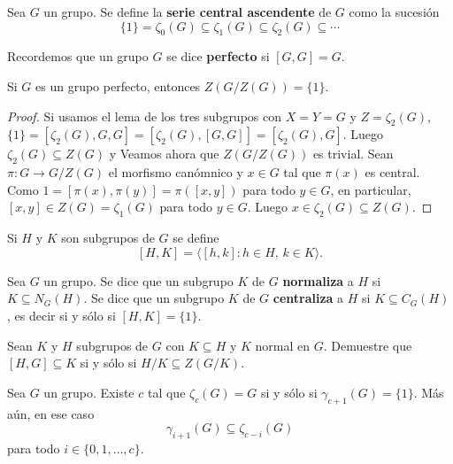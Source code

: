 \begin{definition}
	Sea $G$ un grupo. Se define la \textbf{serie central ascendente} de $G$
	como la sucesión
	\[
		\{1\}=\zeta_0(G)\subseteq\zeta_1(G)\subseteq\zeta_2(G)\subseteq\cdots
	\]
\end{definition}


Recordemos que un grupo $G$ se dice \textbf{perfecto} si $[G,G]=G$.

\begin{theorem}[Gr\"un]
	\label{theorem:Grun}
	Si $G$ es un grupo perfecto, entonces $Z(G/Z(G))=\{1\}$. 
\end{theorem}

\begin{proof}
	Si usamos el lema de los tres subgrupos con $X=Y=G$ y $Z=\zeta_2(G)$, 
	$\{1\}=[\zeta_2(G),G,G]=[\zeta_2(G),[G,G]]=[\zeta_2(G),G]$. Luego 	
	$\zeta_2(G)\subseteq Z(G)$ y
	Veamos ahora que  $Z(G/Z(G))$ es trivial. Sean $\pi\colon G\to G/Z(G)$ el morfismo canómnico
	y $x\in G$ tal que 
	$\pi(x)$ es central. Como $1=[\pi(x),\pi(y)]=\pi([x,y])$ para todo $y\in G$, en particular, 
	$[x,y]\in Z(G)=\zeta_1(G)$ para todo $y\in G$. Luego $x\in\zeta_2(G)\subseteq Z(G)$. 
\end{proof}




Si $H$ y $K$ son subgrupos de $G$ se define
\[
	[H,K]=\langle [h,k]:h\in H,\,k\in K\rangle.
\]

    Sea $G$ un grupo. Se dice que un subgrupo $K$ de $G$ \textbf{normaliza} a
	$H$ si $K\subseteq N_G(H)$.
	Se dice que un subgrupo $K$ de $G$ \textbf{centraliza} a
	$H$ si $K\subseteq C_G(H)$, es decir si y sólo si $[H,K]=\{1\}$.

\begin{exercise}
	Sean $K$ y $H$ subgrupos de $G$ con $K\subseteq H$ y $K$ normal en $G$.
	Demuestre que $[H,G]\subseteq K$ si y sólo si $H/K\subseteq Z(G/K)$. 
\end{exercise}

\begin{lemma}
	\label{lemma:gamma_zeta}
	Sea $G$ un grupo. Existe $c$ tal que $\zeta_c(G)=G$ si y sólo si 
	$\gamma_{c+1}(G)=\{1\}$. Más aún, en ese caso 
	\[
	\gamma_{i+1}(G)\subseteq\zeta_{c-i}(G)
	\]
	para todo $i\in\{0,1,\dots,c\}$. 
\end{lemma}

